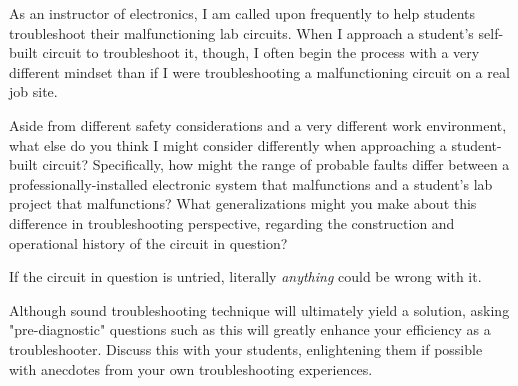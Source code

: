 

As an instructor of electronics, I am called upon frequently to help students troubleshoot their malfunctioning lab circuits.  When I approach a student's self-built circuit to troubleshoot it, though, I often begin the process with a very different mindset than if I were troubleshooting a malfunctioning circuit on a real job site.

Aside from different safety considerations and a very different work environment, what else do you think I might consider differently when approaching a student-built circuit?  Specifically, how might the range of probable faults differ between a professionally-installed electronic system that malfunctions and a student's lab project that malfunctions?  What generalizations might you make about this difference in troubleshooting perspective, regarding the construction and operational history of the circuit in question?







If the circuit in question is untried, literally {\it anything} could be wrong with it.







Although sound troubleshooting technique will ultimately yield a solution, asking "pre-diagnostic" questions such as this will greatly enhance your efficiency as a troubleshooter.  Discuss this with your students, enlightening them if possible with anecdotes from your own troubleshooting experiences.




